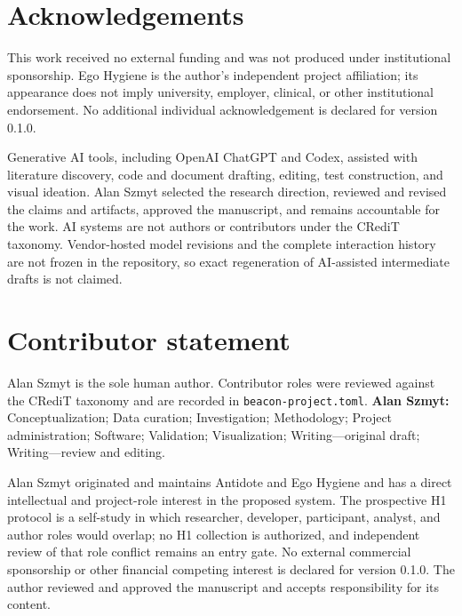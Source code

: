 \section{Acknowledgements}
\label{sec:acknowledgements}

This work received no external funding and was not produced under institutional
sponsorship. Ego Hygiene is the author's independent project affiliation; its
appearance does not imply university, employer, clinical, or other
institutional endorsement. No additional individual acknowledgement is
declared for version 0.1.0.

Generative AI tools, including OpenAI ChatGPT and Codex, assisted with
literature discovery, code and document drafting, editing, test construction,
and visual ideation. Alan Szmyt selected the research direction, reviewed and
revised the claims and artifacts, approved the manuscript, and remains
accountable for the work. AI systems are not authors or contributors under the
CRediT taxonomy. Vendor-hosted model revisions and the complete interaction
history are not frozen in the repository, so exact regeneration of AI-assisted
intermediate drafts is not claimed.

\section{Contributor statement}
\label{sec:contributor-statement}

Alan Szmyt is the sole human author. Contributor roles were reviewed against
the CRediT taxonomy and are recorded in \texttt{beacon-project.toml}.
\textbf{Alan Szmyt:} Conceptualization; Data curation; Investigation;
Methodology; Project administration; Software; Validation; Visualization;
Writing---original draft; Writing---review and editing.

Alan Szmyt originated and maintains Antidote and Ego Hygiene and has a direct
intellectual and project-role interest in the proposed system. The prospective
H1 protocol is a self-study in which researcher, developer, participant,
analyst, and author roles would overlap; no H1 collection is authorized, and
independent review of that role conflict remains an entry gate. No external
commercial sponsorship or other financial competing interest is declared for
version 0.1.0. The author reviewed and approved the manuscript
and accepts responsibility for its content.
